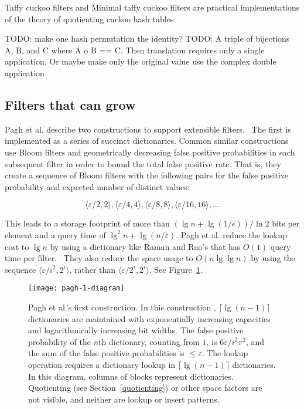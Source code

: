 \documentclass[sigconf, nonacm]{acmart}
\newcommand{\etal}{et al.}
\begin{document}
Taffy cuckoo filters and Minimal taffy cuckoo filters are practical implementations of the theory of quotienting cuckoo hash tables.

TODO: make one hash permutation the identity?
TODO: A triple of bijections A, B, and C where A o B == C. Then translation requires only a single application. Or maybe make only the original value use the complex double application

\subsection{Filters that can grow}

Pagh \etal{} describe two constructions to support extensible filters.~\cite{psw}
The first is implemented as a series of succinct dictionaries.
Common similar constructions use Bloom filters and geometrically decreasing false positive probabilities in each subsequent filter in order to bound the total false positive rate.
That is, they create a sequence of Bloom filters with the following pairs for the false positive probability and expected number of distinct values:

\[
\langle \varepsilon / 2, 2 \rangle,
 \langle \varepsilon / 4, 4 \rangle,
 \langle \varepsilon / 8, 8 \rangle,
 \langle \varepsilon / 16, 16 \rangle,
 \ldots
\]

This leads to a storage footprint of more than $(\lg n + \lg (1/\epsilon)) / \ln 2$ bits per element and a query time of $\lg^2 n + \lg (n/\varepsilon)$.
Pagh \etal{} reduce the lookup cost to $\lg n$ by using a dictionary like Raman and Rao's that has $O(1)$ query time per filter.~\cite{psw,succinct}
They also reduce the space usage to $O(n \lg \lg n)$ by using the sequence $\langle \varepsilon / i^2,  2^i \rangle$, rather than  $\langle \varepsilon / 2^i,  2^i \rangle$.
See Figure~\ref{pagh-1-diagram}.

\begin{figure}
\texttt{[image: pagh-1-diagram]}
\caption{\label{pagh-1-diagram}
Pagh \etal{}'s first construction.
In this construction , $\lceil\lg (n-1) \rceil$ dictionaries are maintained with exponentially increasing capacities and logarithmically increasing bit widths.
The false positive probability of the $n$th dictionary, counting from $1$, is $6 \varepsilon / i^2 \pi^2$, and the sum of the false positive probabilities is $\le \varepsilon$.
The lookup operation requires a dictionary lookup in $\lceil\lg(n-1)\rceil$ dictionaries.\\
In this diagram, columns of blocks represent dictionaries.
Quotienting (see Section~\ref{quotienting}) or other space factors are not visible, and neither are lookup or insert patterns.
}
\end{figure}
\end{document}
